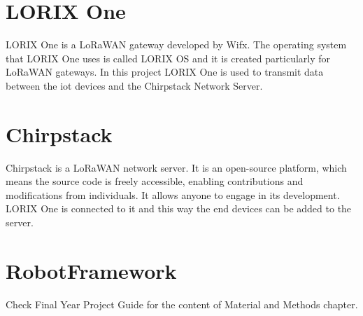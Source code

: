 \section{LORIX One}
LORIX One is a LoRaWAN gateway developed by Wifx.
The operating system that LORIX One uses is called LORIX OS and it is created particularly for LoRaWAN gateways.
In this project LORIX One is used to transmit data between the \gls{iot} devices and the Chirpstack Network Server.
\section{Chirpstack}
    Chirpstack is a LoRaWAN network server. It is an open-source platform, which means the source code is freely accessible, enabling contributions and modifications from individuals. It allows anyone to engage in its development. LORIX One is connected to it and this way the end devices can be added to the server.
\section{RobotFramework}



Check Final Year Project Guide for the content of Material and Methods chapter.

\clearpage %
